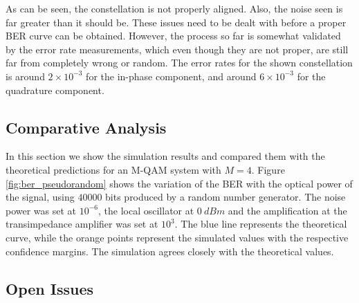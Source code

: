As can be seen, the constellation is not properly aligned. Also, the noise seen is far greater than it should be. These issues need to be dealt with before a proper BER curve can be obtained. However, the process so far is somewhat validated by the error rate measurements, which even though they are not proper, are still far from completely wrong or random. The error rates for the shown constellation is around $2 \times 10^{-3}$ for the in-phase component, and around $6 \times 10^{-3}$ for the quadrature component.

\subsection{Comparative Analysis}

In this section we show the simulation results and compared them with the theoretical predictions for an M-QAM system with $M=4$. Figure \ref{fig:ber_pseudorandom} shows the variation of the BER with the optical power of the signal, using $40000$ bits produced by a random number generator. The noise power was set at $10^{-6}$, the local oscillator at $0~dBm$ and the amplification at the transimpedance amplifier was set at $10^3$.
The blue line represents the theoretical curve, while the orange points represent the simulated values with the respective confidence margins. The simulation agrees closely with the theoretical values.





\subsection{Open Issues}

\newpage



\renewcommand{\bibname}{References}
%


%
%


\cleardoublepage
